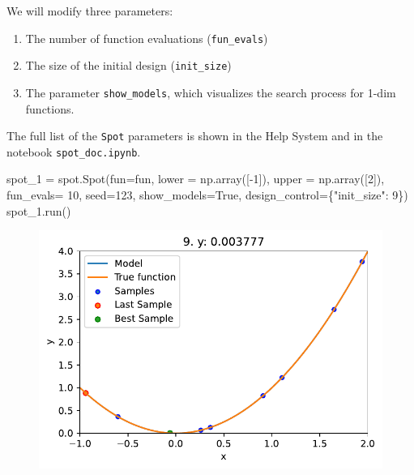\documentclass[
  letterpaper,
  DIV=11,
  numbers=noendperiod]{scrreprt}
\newenvironment{Shaded}{\begin{snugshade}}{\end{snugshade}}
\newcommand{\DecValTok}[1]{\textcolor[rgb]{0.68,0.00,0.00}{#1}}
\newcommand{\NormalTok}[1]{\textcolor[rgb]{0.00,0.23,0.31}{#1}}
\newcommand{\OperatorTok}[1]{\textcolor[rgb]{0.37,0.37,0.37}{#1}}
\newcommand{\StringTok}[1]{\textcolor[rgb]{0.13,0.47,0.30}{#1}}
\newcommand{\VariableTok}[1]{\textcolor[rgb]{0.07,0.07,0.07}{#1}}
\providecommand{\tightlist}{%
  \setlength{\itemsep}{0pt}\setlength{\parskip}{0pt}}\usepackage{longtable,booktabs,array}
\begin{document}
We will modify three parameters:

\begin{enumerate}
\def\labelenumi{\arabic{enumi}.}
\tightlist
\item
  The number of function evaluations (\texttt{fun\_evals})
\item
  The size of the initial design (\texttt{init\_size})
\item
  The parameter \texttt{show\_models}, which visualizes the search
  process for 1-dim functions.
\end{enumerate}

The full list of the \texttt{Spot} parameters is shown in the Help
System and in the notebook \texttt{spot\_doc.ipynb}.

\begin{Shaded}
\begin{Highlighting}[]
\NormalTok{spot\_1 }\OperatorTok{=}\NormalTok{ spot.Spot(fun}\OperatorTok{=}\NormalTok{fun,}
\NormalTok{                   lower }\OperatorTok{=}\NormalTok{ np.array([}\OperatorTok{{-}}\DecValTok{1}\NormalTok{]),}
\NormalTok{                   upper }\OperatorTok{=}\NormalTok{ np.array([}\DecValTok{2}\NormalTok{]),}
\NormalTok{                   fun\_evals}\OperatorTok{=} \DecValTok{10}\NormalTok{,}
\NormalTok{                   seed}\OperatorTok{=}\DecValTok{123}\NormalTok{,}
\NormalTok{                   show\_models}\OperatorTok{=}\VariableTok{True}\NormalTok{,}
\NormalTok{                   design\_control}\OperatorTok{=}\NormalTok{\{}\StringTok{"init\_size"}\NormalTok{: }\DecValTok{9}\NormalTok{\})}
\NormalTok{spot\_1.run()}
\end{Highlighting}
\end{Shaded}

\begin{figure}[H]

{\centering \includegraphics{007_num_spot_intro_files/figure-pdf/cell-10-output-1.pdf}

}

\end{figure}
\end{document}
